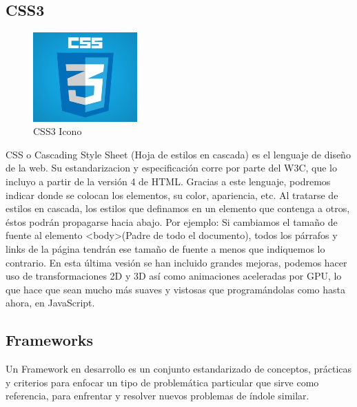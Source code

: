 \subsection{CSS3}
\begin{figure}[!h]
    \centering
    \includegraphics[width=40mm]{img/introduccion/css.jpg}
    \caption{CSS3 Icono}
\end{figure}
CSS o Cascading Style Sheet (Hoja de estilos en cascada) es el lenguaje de diseño de la web.
Su estandarizacion y especificación corre por parte del W3C, que lo incluyo a partir de la versión 4 de HTML.
Gracias a este lenguaje, podremos indicar donde se colocan los elementos, su color, apariencia, etc.
Al tratarse de estilos en cascada, los estilos que definamos en un elemento que contenga a otros, éstos podrán propagarse hacia abajo. Por ejemplo: Si cambiamos el tamaño de fuente al elemento <body>(Padre de todo el documento), todos los párrafos y links de la página tendrán ese tamaño de fuente a menos que indiquemos lo contrario.
En esta última vesión se han incluido grandes mejoras, podemos hacer uso de transformaciones 2D y 3D así como animaciones aceleradas por GPU, lo que hace que sean mucho más suaves y vistosas que programándolas como hasta ahora, en JavaScript.
\subsection{Frameworks}
Un Framework en desarrollo es un conjunto estandarizado de conceptos, prácticas y criterios para enfocar un tipo de problemática particular que sirve como referencia, para enfrentar y resolver nuevos problemas de índole similar.

